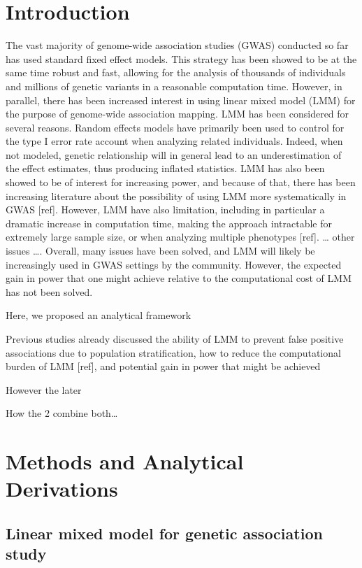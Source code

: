\documentclass[]{book}
\begin{document}
\section{Introduction}\label{introduction}

The vast majority of genome-wide association studies (GWAS) conducted so
far has used standard fixed effect models. This strategy has been showed
to be at the same time robust and fast, allowing for the analysis of
thousands of individuals and millions of genetic variants in a
reasonable computation time. However, in parallel, there has been
increased interest in using linear mixed model (LMM) for the purpose of
genome-wide association mapping. LMM has been considered for several
reasons. Random effects models have primarily been used to control for
the type I error rate account when analyzing related individuals.
Indeed, when not modeled, genetic relationship will in general lead to
an underestimation of the effect estimates, thus producing inflated
statistics. LMM has also been showed to be of interest for increasing
power, and because of that, there has been increasing literature about
the possibility of using LMM more systematically in GWAS {[}ref{]}.
However, LMM have also limitation, including in particular a dramatic
increase in computation time, making the approach intractable for
extremely large sample size, or when analyzing multiple phenotypes
{[}ref{]}. \ldots{} other issues \ldots{}. Overall, many issues have
been solved, and LMM will likely be increasingly used in GWAS settings
by the community. However, the expected gain in power that one might
achieve relative to the computational cost of LMM has not been solved.

Here, we proposed an analytical framework

Previous studies already discussed the ability of LMM to prevent false
positive associations due to population stratification, how to reduce
the computational burden of LMM {[}ref{]}, and potential gain in power
that might be achieved

However the later

How the 2 combine both\ldots{}

\section{Methods and Analytical
Derivations}\label{methods-and-analytical-derivations}

\subsection{Linear mixed model for genetic association
study}\label{linear-mixed-model-for-genetic-association-study}
\end{document}
